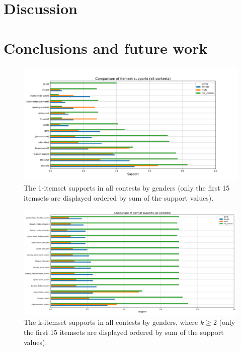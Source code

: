 \documentclass[english]{tktltiki}
\begin{document}
	\section{Discussion}
	\label{section::discussion}
	
	\pagebreak

	\section{Conclusions and future work}
	\label{section::conclusions}
	
\pagebreak
\nocite{*}



\lastpage
\appendices
\pagestyle{empty}

\begin{figure}[h] 
    \begin{center}
        \includegraphics[width=1\textwidth,center]{Images/itemset_supports-gender-all_contests-1_itemset.png}
        The 1-itemset supports in all contests by genders (only the first 15 itemsets are displayed ordered by sum of the support values).
    \end{center}
\end{figure}

\clearpage
{}
\begin{figure}[h] 
    \begin{center}
        \includegraphics[width=1\textwidth,center]{Images/itemset_supports-gender-all_contests-over2_itemset.png}
        The k-itemset supports in all contests by genders, where $k \geq 2$ (only the first 15 itemsets are displayed ordered by sum of the support values).
    \end{center}
\end{figure}
\end{document}
